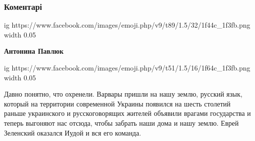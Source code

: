  
 
 
 
 
\subsubsection{Коментарі}
\label{sec:07_08_2021.fb.lenko_maksim.1.ukrainizacia.cmt}


\begin{itemize}


\ifcmt
  ig https://www.facebook.com/images/emoji.php/v9/t89/1.5/32/1f44c_1f3fb.png
  width 0.05
\fi

\begin{itemize}
 
\textbf{Антонина Павлюк} 

\ifcmt
  ig https://www.facebook.com/images/emoji.php/v9/t51/1.5/16/1f64c_1f3fb.png
  width 0.05
\fi

\end{itemize}

 

Давно понятно, что охренели. Варвары пришли на нашу землю, русский язык,
который на территории современной Украины появился на шесть столетий раньше
украинского и русскоговорящих жителей объявили врагами государства и теперь
выгоняют нас отсюда, чтобы забрать наши дома и нашу землю. Еврей Зеленский
оказался Иудой и вся его команда.

\begin{itemize}
 

\end{itemize}
\end{itemize}
